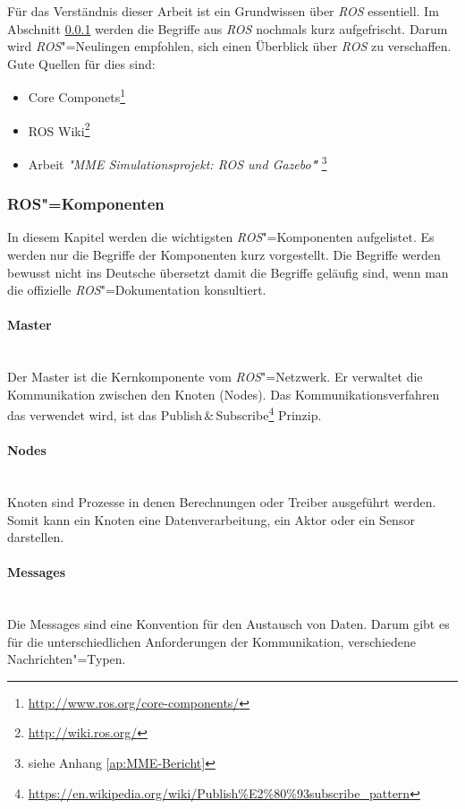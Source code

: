 Für das Verständnis dieser Arbeit ist ein Grundwissen über \textit{ROS} essentiell.
Im Abschnitt \ref{chap:ros-komponenten} werden die Begriffe aus \textit{ROS} nochmals kurz aufgefrischt.
Darum wird \textit{ROS}"=Neulingen empfohlen, sich einen Überblick über \textit{ROS} zu verschaffen.
Gute Quellen für dies sind:
\begin{itemize}
\item Core Componets\footnote{\url{http://www.ros.org/core-components/}} 
\item ROS Wiki\footnote{\url{http://wiki.ros.org/}}
\item Arbeit \textit{\textsc{"}MME Simulationsprojekt: ROS und Gazebo\textbf{"}} \footnote{siehe Anhang \ref{ap:MME-Bericht}}
\end{itemize}

\subsubsection{ROS"=Komponenten}
\label{chap:ros-komponenten}
In diesem Kapitel werden die wichtigsten \textit{ROS}"=Komponenten aufgelistet.
Es werden nur die Begriffe der Komponenten kurz vorgestellt.
Die Begriffe werden bewusst nicht ins Deutsche übersetzt damit die Begriffe geläufig sind, wenn man die offizielle \textit{ROS}"=Dokumentation konsultiert.

\paragraph*{Master} \mbox{}\\
Der Master ist die Kernkomponente vom \textit{ROS}"=Netzwerk.
Er verwaltet die Kommunikation zwischen den Knoten (Nodes).
Das Kommunikationsverfahren das verwendet wird, ist das Publish\,\&\,Subscribe\footnote{\url{https://en.wikipedia.org/wiki/Publish\%E2\%80\%93subscribe_pattern}}  Prinzip. 

\paragraph*{Nodes} \mbox{}\\
Knoten sind Prozesse in denen Berechnungen oder Treiber ausgeführt werden. 
Somit kann ein Knoten eine Datenverarbeitung, ein Aktor oder ein Sensor darstellen.  

\paragraph*{Messages} \mbox{}\\
Die Messages sind eine Konvention für den Austausch von Daten.
Darum gibt es für die unterschiedlichen Anforderungen der Kommunikation, verschiedene Nachrichten"=Typen.

